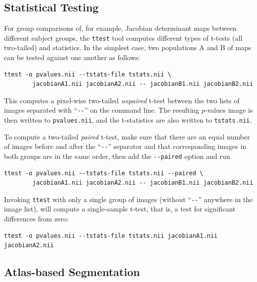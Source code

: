 \documentclass{InsightArticle}
\begin{document}
\subsection{Statistical Testing}

For group comparisons of, for example, Jacobian determinant maps between
different subject groups, the \verb|ttest| tool  computes different types of t-tests (all
two-tailed) and statistics. In the simplest case, two populations A and B of
maps can be tested against one another as follows:
\begin{verbatim}
ttest -o pvalues.nii --tstats-file tstats.nii \
        jacobianA1.nii jacobianA2.nii -- jacobianB1.nii jacobianB2.nii
\end{verbatim} 
This computes a pixel-wise two-tailed {\em unpaired\/} t-test between the two
lists of images separated with ``\verb|--|'' on the command line. The
resulting $p$-values image is then written to \verb|pvalues.nii|, and the
t-statistics are also written to \verb|tstats.nii|.

To compute a two-tailed {\em paired\/} t-test, make sure that there are an
equal number of images before and after the ``\verb|--|'' separator and that
corresponding images in both groups are in the same order, then add the
\verb|--paired| option and run
\begin{verbatim}
ttest -o pvalues.nii --tstats-file tstats.nii --paired \
        jacobianA1.nii jacobianA2.nii -- jacobianB1.nii jacobianB2.nii
\end{verbatim}
Invoking \verb|ttest| with only a single group of images (without
``\verb|--|'' anywhere in the image list), will compute a single-sample
t-test, that is, a test for significant differences from zero:
\begin{verbatim}
ttest -o pvalues.nii --tstats-file tstats.nii jacobianA1.nii jacobianA2.nii
\end{verbatim} 


\subsection{Atlas-based Segmentation}
\end{document}
